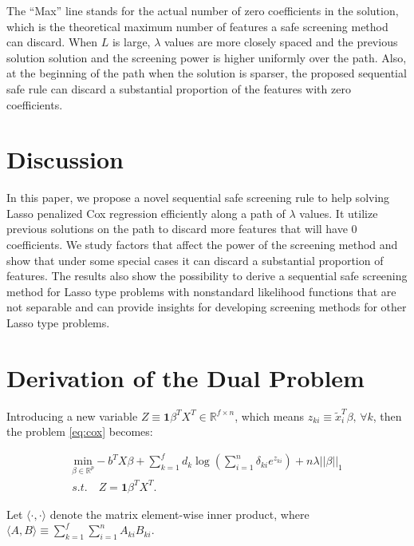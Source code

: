The ``Max'' line stands for the actual number of zero coefficients in the solution, which is the theoretical maximum number of features a safe screening method can discard. When $L$ is large, $\lambda$ values are more closely spaced and the previous solution solution and the screening power is higher uniformly over the path. Also, at the beginning of the path when the solution is sparser, the proposed sequential safe rule can discard a substantial proportion of the features with zero coefficients.

\section{Discussion}

In this paper, we propose a novel sequential safe screening rule to help solving Lasso penalized Cox regression efficiently along a path of $\lambda$ values. It utilize previous solutions on the path to discard more features that will have 0 coefficients. We study factors that affect the power of the screening method and show that under some special cases it can discard a substantial proportion of features. The results also show the possibility to derive a sequential safe screening method for Lasso type problems with nonstandard likelihood functions that are not separable and can provide insights for developing screening methods for other Lasso type problems.

\appendix
\appendixpage


\section{Derivation of the Dual Problem}


Introducing a new variable $Z\equiv\mathbf{1}\beta^TX^T\in\mathbb{R}^{f\times n}$, which means $z_{ki}\equiv\tilde{x}_i^T\beta,\,\forall k$, then the problem \eqref{eq:cox} becomes:

\begin{equation}
    \label{eq:dual+z}
    \begin{gathered}
    \underset{\beta\in \mathbb{R}^p}{\mathrm{min}}-b^TX\beta+\sum_{k=1}^f d_k\log\left(\sum_{i=1}^n \delta_{ki} e^{z_{ki}}\right)+n\lambda||\beta||_1\\s.t.\quad Z=\mathbf{1}\beta^TX^T.
\end{gathered}
\end{equation}

Let $\langle\cdot,\cdot\rangle$ denote the matrix element-wise inner product, where $\langle A,B \rangle\equiv\sum_{k=1}^f\sum_{i=1}^nA_{ki}B_{ki}$.

